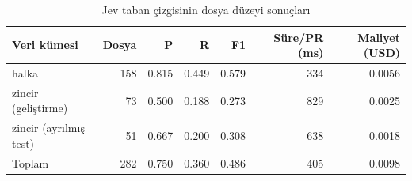\begin{table}[H]
\centering
\caption{Jev taban çizgisinin dosya düzeyi sonuçları}
\label{tbl:jev_dosya}
\begin{tabular}{lrrrrrr}
\toprule
Veri kümesi & Dosya & P & R & F1 & Süre/PR (ms) & Maliyet (USD) \\
\midrule
halka & 158 & 0.815 & 0.449 & 0.579 & 334 & 0.0056 \\
zincir (geliştirme) & 73 & 0.500 & 0.188 & 0.273 & 829 & 0.0025 \\
zincir (ayrılmış test) & 51 & 0.667 & 0.200 & 0.308 & 638 & 0.0018 \\
\midrule
Toplam & 282 & 0.750 & 0.360 & 0.486 & 405 & 0.0098 \\
\bottomrule
\end{tabular}
\end{table}
